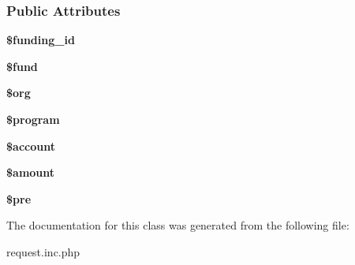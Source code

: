 \subsubsection*{Public Attributes}
\begin{DoxyCompactItemize}
\item 
\hypertarget{classfunding_ad97cefcb5214a45322cf25a6bfad437a}{{\bfseries \$funding\-\_\-id}}\label{classfunding_ad97cefcb5214a45322cf25a6bfad437a}

\item 
\hypertarget{classfunding_a1f25e2e1e6844cae492cd4c8492c4eda}{{\bfseries \$fund}}\label{classfunding_a1f25e2e1e6844cae492cd4c8492c4eda}

\item 
\hypertarget{classfunding_aa47d01dfc738988a34dea159fd711aee}{{\bfseries \$org}}\label{classfunding_aa47d01dfc738988a34dea159fd711aee}

\item 
\hypertarget{classfunding_ab185734c844be5ced263fe1734db6a36}{{\bfseries \$program}}\label{classfunding_ab185734c844be5ced263fe1734db6a36}

\item 
\hypertarget{classfunding_aae462c12720de4ac6df8e695bf973e1b}{{\bfseries \$account}}\label{classfunding_aae462c12720de4ac6df8e695bf973e1b}

\item 
\hypertarget{classfunding_ae3aa61fa39c596b3cd5616aea5c6c208}{{\bfseries \$amount}}\label{classfunding_ae3aa61fa39c596b3cd5616aea5c6c208}

\item 
\hypertarget{classfunding_a8884b1589de04a51934cc1414bb3dd95}{{\bfseries \$pre}}\label{classfunding_a8884b1589de04a51934cc1414bb3dd95}

\end{DoxyCompactItemize}


The documentation for this class was generated from the following file\-:\begin{DoxyCompactItemize}
\item 
request.\-inc.\-php\end{DoxyCompactItemize}

